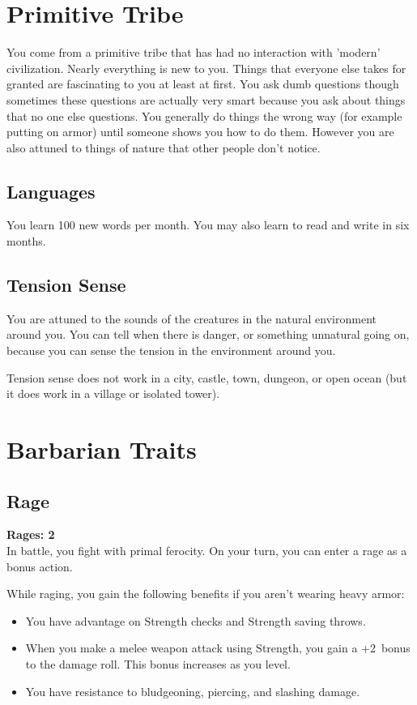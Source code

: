 \documentclass[letterpaper,openany,oneside,twocolumn]{book}
\begin{document}
\section*{Primitive Tribe}
You come from a primitive tribe that has had no interaction with 'modern' civilization. Nearly everything is new to you. Things that everyone else takes for granted are fascinating to you at least at first. You ask dumb questions though sometimes these questions are actually very smart because you ask about things that no one else questions. You generally do things the wrong way (for example putting on armor) until someone shows you how to do them. However you are also attuned to things of nature that other people don't notice.
\subsection*{Languages}
You learn 100 new words per month. You may also learn to read and write in six months.
\subsection*{Tension Sense}
You are attuned to the sounds of the creatures in the natural environment around you. You can tell when there is danger, or something unnatural going on, because you can sense the tension in the environment around you.

Tension sense does not work in a city, castle, town, dungeon, or open ocean (but it does work in a village or isolated tower).

\section*{Barbarian Traits}
\subsection*{Rage}
\newcommand{\RageModifier}{2}
\textbf{Rages: 2}\\
In battle, you fight with primal ferocity. On your turn, you can enter a rage as a bonus action.

While raging, you gain the following benefits if you aren't wearing heavy armor:

\begin{itemize}
	\item You have advantage on Strength checks and Strength saving throws.
	\item When you make a melee weapon attack using Strength, you gain a +\RageModifier ~bonus to the damage roll. This bonus increases as you level.
	\item You have resistance to bludgeoning, piercing, and slashing damage.
\end{itemize}
\end{document}
